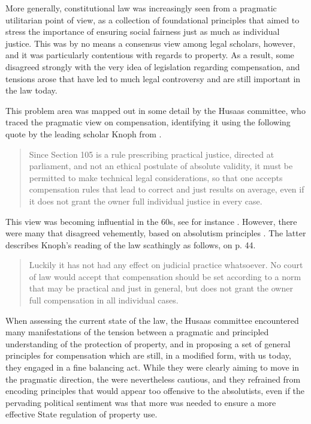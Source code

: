 \documentclass[10pt]{article} %
\begin{document}
More generally, constitutional law was increasingly seen from a pragmatic utilitarian point of view, as a collection of foundational principles that aimed to stress the importance of ensuring social fairness just as much as individual justice. This was by no means a consensus view among legal scholars, however, and it was particularly contentious with regards to property. As a result, some disagreed strongly with the very idea of legislation regarding compensation, and tensions arose that have led to much legal controversy and are still important in the law today. 

This problem area was mapped out in some detail by the Husaas committee, who traced the pragmatic view on compensation, identifying it using the following quote by the leading scholar Knoph from \cite[p. 113]{knoph}.

\begin{quote}
Since Section 105 is a rule prescribing practical justice, directed at parliament, and not an ethical postulate of absolute validity, it must be permitted to make technical legal considerations, so that one accepts compensation rules that lead to correct and just results on average, even if it does not grant the owner full individual justice in every case.
\end{quote}

This view was becoming influential in the 60s, see for instance \cite{grunn,opshal}. However, there were many that disagreed vehemently, based on absolutism principles \cite{robb2,schj}. The latter describes Knoph's reading of the law scathingly as follows, on p. 44.

\begin{quote}Luckily it has not had any effect on judicial practice whatsoever. No court of law would accept that compensation should be set according to a norm that may be practical and just in general, but does not grant the owner full compensation in all individual cases.
\end{quote}

When assessing the current state of the law, the Husaas committee encountered many manifestations of the tension between a pragmatic and principled understanding of the protection of property, and in proposing a set of general principles for compensation which are still, in a modified form, with us today, they engaged in a fine balancing act. While they were clearly aiming to move in the pragmatic direction, the were nevertheless cautious, and they refrained from encoding principles that would appear too offensive to the absolutists, even if the pervading political sentiment was that more was needed to ensure a more effective State regulation of property use. 
\end{document}
